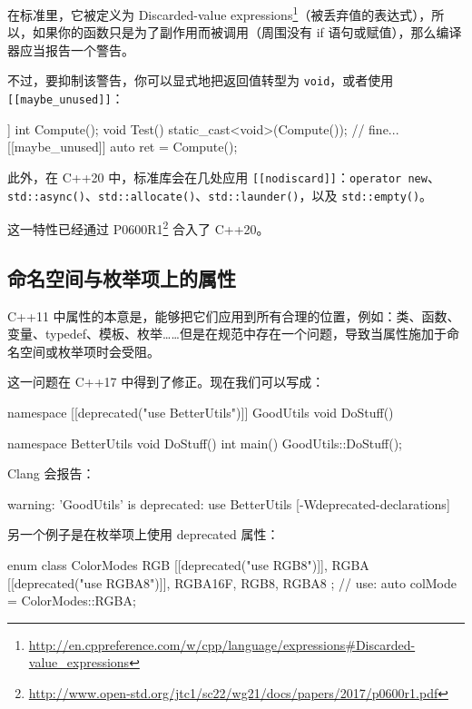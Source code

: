 在标准里，它被定义为 Discarded-value expressions\footnote{\url{http://en.cppreference.com/w/cpp/language/expressions\#Discarded-value_expressions}}（被丢弃值的表达式），所以，如果你的函数只是为了副作用而被调用（周围没有 if 语句或赋值），那么编译器应当报告一个警告。

不过，要抑制该警告，你可以显式地把返回值转型为 \texttt{void}，或者使用 \texttt{\texttt{\texttt{[[maybe\_unused]]}}}：

\begin{codebox}[cpp]
[[nodiscard]] int Compute();
void Test() {
static_cast<void>(Compute()); // fine...
[[maybe_unused]] auto ret = Compute();
}
\end{codebox}

此外，在 C++20 中，标准库会在几处应用 \texttt{\texttt{\texttt{[[nodiscard]]}}}：\texttt{operator new}、\texttt{std::async()}、\texttt{std::allocate()}、\texttt{std::launder()}，以及 \texttt{std::empty()}。

这一特性已经通过 P0600R1\footnote{\url{http://www.open-std.org/jtc1/sc22/wg21/docs/papers/2017/p0600r1.pdf}} 合入了 C++20。

\subsection{命名空间与枚举项上的属性}

C++11 中属性的本意是，能够把它们应用到所有合理的位置，例如：类、函数、变量、typedef、模板、枚举……但是在规范中存在一个问题，导致当属性施加于命名空间或枚举项时会受阻。

这一问题在 C++17 中得到了修正。现在我们可以写成：

\begin{codebox}[cpp]
namespace [[deprecated("use BetterUtils")]] GoodUtils {
void DoStuff() { }
}
\end{codebox}

\begin{codebox}[cpp]
namespace BetterUtils {
void DoStuff() { }
}
int main()
{
GoodUtils::DoStuff();
}
\end{codebox}

Clang 会报告：

\begin{codebox}
warning: 'GoodUtils' is deprecated: use BetterUtils
[-Wdeprecated-declarations]
\end{codebox}

另一个例子是在枚举项上使用 deprecated 属性：

\begin{codebox}[cpp]
enum class ColorModes
{
RGB [[deprecated("use RGB8")]],
RGBA [[deprecated("use RGBA8")]],
RGBA16F,
RGB8,
RGBA8
};
// use:
auto colMode = ColorModes::RGBA;
\end{codebox}

